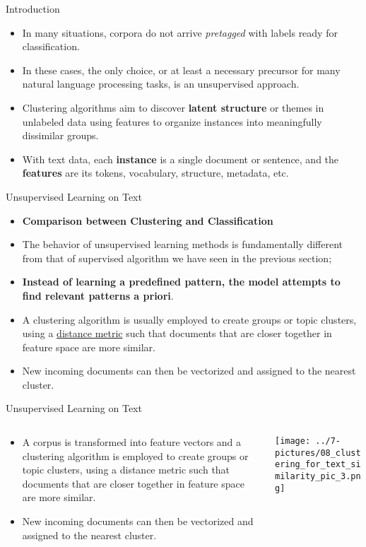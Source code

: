 \documentclass[11pt]{beamer}
\begin{document}
\begin{frame}{Introduction}
	\begin{itemize}
		\item In many situations, corpora do not arrive \textit{pretagged} with labels ready for classification. 
		\item In these cases, the only choice, or at least a necessary precursor for many natural language processing tasks, is an unsupervised approach. 
		\item Clustering algorithms aim to discover \textbf{latent structure} or themes in unlabeled data using features to organize instances into meaningfully dissimilar groups.
		\item With text data, each \textbf{ instance} is a single document or sentence, and the \textbf{features} are its tokens, vocabulary, structure, metadata, etc.
	\end{itemize}
\end{frame}
\begin{frame}{Unsupervised Learning on Text}
	\begin{itemize}
		\item \textbf{Comparison between Clustering and Classification}
		\item The behavior of unsupervised learning methods is fundamentally different from that of supervised algorithm we have seen in the previous section; 
		\item \textbf{Instead of learning a predefined pattern, the model attempts to find relevant patterns a priori}.
		\item A clustering algorithm is usually employed to create groups or topic clusters, using a \underline{distance metric} such that documents that are closer together in feature space are more similar. 
		\item New incoming documents can then be vectorized and assigned to the nearest cluster.
	\end{itemize}
\end{frame}
\begin{frame}{Unsupervised Learning on Text}
\begin{columns}[T] %
\begin{column}{.48\textwidth}
        \begin{itemize}
		\item A corpus is transformed into feature vectors and a clustering algorithm is employed to create groups or topic clusters, using a distance metric such that documents that are closer together in feature space are more similar. 
		\item New incoming documents can then be vectorized and assigned to the nearest cluster.
        \end{itemize}
\end{column}%
\hfill%
\begin{column}{.48\textwidth}
        \texttt{[image: ../7-pictures/08\_clustering\_for\_text\_similarity\_pic\_3.png]}
\end{column}%
\end{columns}
\end{frame}
\end{document}
